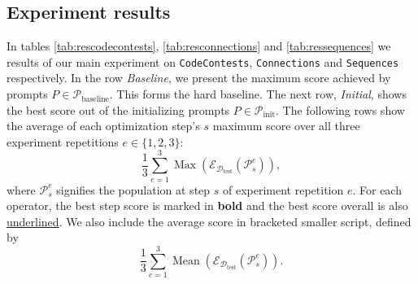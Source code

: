 \subsection{Experiment results}
In tables \ref{tab:rescodecontests}, \ref{tab:resconnections} and \ref{tab:ressequences} we results of our 
main experiment on \texttt{CodeContests}, \texttt{Connections} and \texttt{Sequences} respectively.
In the row \textit{Baseline}, we present the maximum score achieved by prompts $P\in\mathcal{P}_{\text{baseline}}$. 
This forms the hard baseline. The next row, \textit{Initial}, shows the best score out of the initializing prompts $P\in\mathcal{P}_{\text{init}}$.
The following rows show the average of each optimization step's $s$ maximum score over all three experiment repetitions $e\in\{1,2,3\}$:
\begin{equation}
    \frac{1}{3}\sum_{e=1}^{3}\operatorname{Max}(\mathcal{E}_{\mathcal{D}_{\text{test}}}(\mathcal{P}_{s}^{e})),
\end{equation}
where $\mathcal{P}_{s}^{e}$ signifies the population at step $s$ of experiment repetition $e$.
For each operator, the best step score is marked in \textbf{bold} and the best score overall is also \underline{underlined}.
We also include the average score in  bracketed smaller script, defined by 
\begin{equation}
    \frac{1}{3}\sum_{e=1}^{3}\operatorname{Mean}(\mathcal{E}_{\mathcal{D}_{\text{test}}}(\mathcal{P}_{s}^{e})).
\end{equation}

